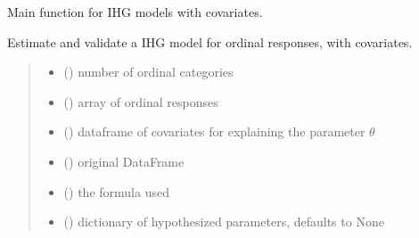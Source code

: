 \documentclass[letterpaper,10pt,english]{sphinxmanual}
\begin{document}

\begin{fulllineitems}
\label{\detokenize{cubmods:cubmods.ihg_v.mle}}
\pysigstartsignatures
{}
\pysigstopsignatures
\sphinxAtStartPar
Main function for IHG models with covariates.

\sphinxAtStartPar
Estimate and validate a IHG model for ordinal responses, with covariates.
\begin{quote}\begin{description}
\begin{itemize}
\item {} 
\sphinxAtStartPar
{} () \textendash{} number of ordinal categories

\item {} 
\sphinxAtStartPar
{} () \textendash{} array of ordinal responses

\item {} 
\sphinxAtStartPar
{} () \textendash{} dataframe of covariates for explaining the parameter \(\theta\)

\item {} 
\sphinxAtStartPar
{} () \textendash{} original DataFrame

\item {} 
\sphinxAtStartPar
{} () \textendash{} the formula used

\item {} 
\sphinxAtStartPar
{} (\sphinxstyleliteralemphasis{\sphinxupquote{, }}) \textendash{} dictionary of hypothesized parameters, defaults to None


\end{itemize}
\end{description}
\end{quote}
\end{fulllineitems}
\end{document}
